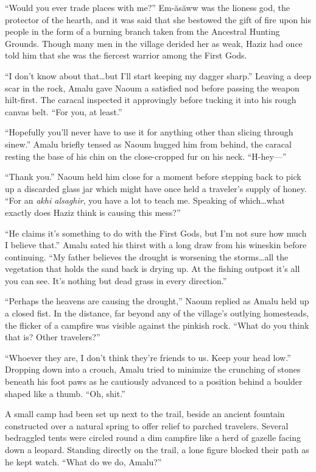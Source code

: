 ``Would you ever trade places with me?'' Em-ăsăww was the lioness god, the protector of the hearth, and it was said that she bestowed the gift of fire upon his people in the form of a burning branch taken from the Ancestral Hunting Grounds. Though many men in the village derided her as weak, Haziz had once told him that she was the fiercest warrior among the First Gods.

``I don't know about that\ldots{}but I'll start keeping my dagger sharp.'' Leaving a deep scar in the rock, Amalu gave Naoum a satisfied nod before passing the weapon hilt-first. The caracal inspected it approvingly before tucking it into his rough canvas belt. ``For you, at least.''

``Hopefully you'll never have to use it for anything other than slicing through sinew.'' Amalu briefly tensed as Naoum hugged him from behind, the caracal resting the base of his chin on the close-cropped fur on his neck. ``H-hey---''

``Thank you.'' Naoum held him close for a moment before stepping back to pick up a discarded glass jar which might have once held a traveler's supply of honey. ``For an \emph{akhi alsaghir}, you have a lot to teach me. Speaking of which\ldots{}what exactly does Haziz think is causing this mess?''

``He claims it's something to do with the First Gods, but I'm not sure how much I believe that.'' Amalu sated his thirst with a long draw from his wineskin before continuing. ``My father believes the drought is worsening the storms\ldots{}all the vegetation that holds the sand back is drying up. At the fishing outpost it's all you can see. It's nothing but dead grass in every direction.''

``Perhaps the heavens are causing the drought,'' Naoum replied as Amalu held up a closed fist. In the distance, far beyond any of the village's outlying homesteads, the flicker of a campfire was visible against the pinkish rock. ``What do you think that is? Other travelers?''

``Whoever they are, I don't think they're friends to us. Keep your head low.'' Dropping down into a crouch, Amalu tried to minimize the crunching of stones beneath his foot paws as he cautiously advanced to a position behind a boulder shaped like a thumb. ``Oh, shit.''

A small camp had been set up next to the trail, beside an ancient fountain constructed over a natural spring to offer relief to parched travelers. Several bedraggled tents were circled round a dim campfire like a herd of gazelle facing down a leopard. Standing directly on the trail, a lone figure blocked their path as he kept watch. ``What do we do, Amalu?''


